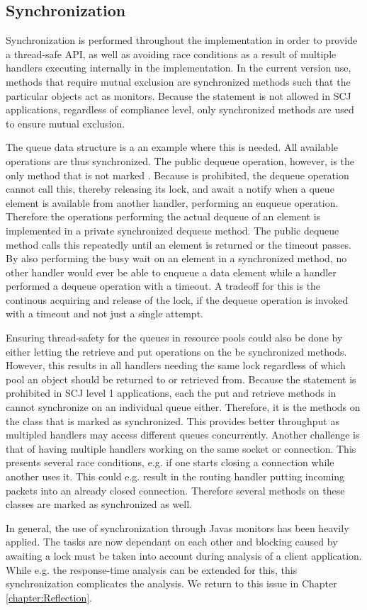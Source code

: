 \subsection{Synchronization} %
\label{sub:synchronization}
Synchronization is performed throughout the implementation in order to provide a thread-safe API, as well as avoiding race conditions as a result of multiple handlers executing internally in the implementation. In the current version use, methods that require mutual exclusion are synchronized methods such that the particular objects act as monitors. Because the  statement is not allowed in SCJ applications, regardless of compliance level, only synchronized methods are used to ensure mutual exclusion.

The queue data structure is a an example where this is needed. All available operations are thus synchronized. The public dequeue operation, however, is the only method that is not marked . Because  is prohibited, the dequeue operation cannot call this, thereby releasing its lock, and await a notify when a queue element is available from another handler, performing an enqueue operation. Therefore the operations performing the actual dequeue of an element is implemented in a private synchronized dequeue method. The public dequeue method calls this repeatedly until an element is returned or the timeout passes. By also performing the busy wait on an element in a synchronized method, no other handler would ever be able to enqueue a data element while a handler performed a dequeue operation with a timeout. A tradeoff for this is the continous acquiring and release of the lock, if the dequeue operation is invoked with a timeout and not just a single attempt.

Ensuring thread-safety for the queues in resource pools could also be done by either letting the retrieve and put operations on the  be synchronized methods. However, this results in all handlers needing the same lock regardless of which pool an object should be returned to or retrieved from. Because the  statement is prohibited in SCJ level 1 applications, each the put and retrieve methods in  cannot synchronize on an individual queue either. Therefore, it is the methods on the  class that is marked as synchronized. This provides better throughput as multipled handlers may access different queues concurrently. Another challenge is that of having multiple handlers working on the same socket or connection. This presents several race conditions, e.g. if one starts closing a connection while another uses it. This could e.g. result in the routing handler putting incoming packets into an already closed connection. Therefore several methods on these classes are marked as synchronized as well.

In general, the use of synchronization through Javas monitors has been heavily applied. The tasks are now dependant on each other and blocking caused by awaiting a lock must be taken into account during analysis of a client application. While e.g. the response-time analysis can be extended for this\cite{alan2001real}, this synchronization complicates the analysis. We return to this issue in Chapter \ref{chapter:Reflection}.